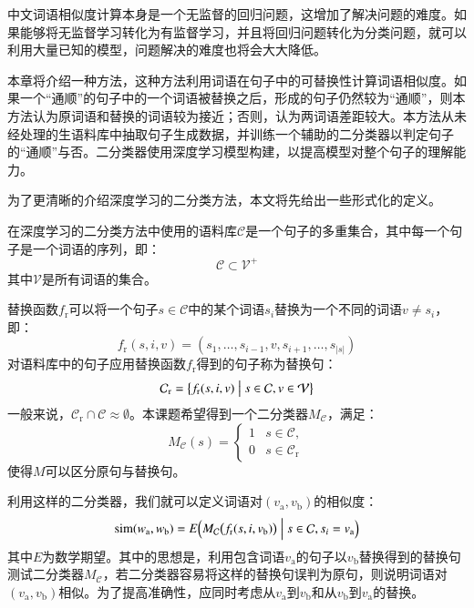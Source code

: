 
中文词语相似度计算本身是一个无监督的回归问题，这增加了解决问题的难度。如果能够将无监督学习转化为有监督学习，并且将回归问题转化为分类问题，就可以利用大量已知的模型，问题解决的难度也将会大大降低。

本章将介绍一种方法，这种方法利用词语在句子中的可替换性计算词语相似度。如果一个“通顺”的句子中的一个词语被替换之后，形成的句子仍然较为“通顺”，则本方法认为原词语和替换的词语较为接近；否则，认为两词语差距较大。本方法从未经处理的生语料库中抽取句子生成数据，并训练一个辅助的二分类器以判定句子的“通顺”与否。二分类器使用深度学习模型构建，以提高模型对整个句子的理解能力。

\label{s:classifer pricinple}
为了更清晰的介绍深度学习的二分类方法，本文将先给出一些形式化的定义。

在深度学习的二分类方法中使用的语料库$\mathcal{C}$是一个句子的多重集合，其中每一个句子是一个词语的序列，即：
\begin{equation}
\mathcal{C} \subset \mathcal{V}^+
\end{equation}
其中$\mathcal{V}$是所有词语的集合。

替换函数$f_\text{r}$可以将一个句子$s \in \mathcal{C}$中的某个词语$s_i$替换为一个不同的词语$v \ne s_i$，即：
\begin{equation}
f_\text{r}(s, i, v) = (s_1, \dots, s_{i - 1}, v, s_{i + 1}, \dots, s_{|s|})
\end{equation}
对语料库中的句子应用替换函数$f_\text{r}$得到的句子称为替换句：
\begin{equation}
\mathcal{C}_\text{r} = \bigl\{f_\text{r}(s, i, v) \bigm| s \in \mathcal{C}, v \in \mathcal{V}\bigr\}
\end{equation}
一般来说，$\mathcal{C}_\text{r} \cap \mathcal{C} \approx \emptyset$。本课题希望得到一个二分类器$M_\mathcal{C}$，满足：
\begin{equation}
M_\mathcal{C}(s) = 
\begin{cases}
1 & s \in \mathcal{C}, \\
0 & s \in \mathcal{C}_\text{r}
\end{cases}
\end{equation}
使得$M$可以区分原句与替换句。

利用这样的二分类器，我们就可以定义词语对$(v_\text{a}, v_\text{b})$的相似度：
\begin{equation}
\operatorname{sim}(w_\text{a}, w_\text{b}) = E\Bigl(M_\mathcal{C}\bigl(f_\text{r}(s, i, v_\text{b})\bigr) \Bigm| s \in \mathcal{C}, s_i = v_\text{a}\Bigr)
\end{equation}
其中$E$为数学期望。其中的思想是，利用包含词语$v_\text{a}$的句子以$v_\text{b}$替换得到的替换句测试二分类器$M_\mathcal{C}$，若二分类器容易将这样的替换句误判为原句，则说明词语对$(v_\text{a}, v_\text{b})$相似。为了提高准确性，应同时考虑从$v_\text{a}$到$v_\text{b}$和从$v_\text{b}$到$v_\text{a}$的替换。

